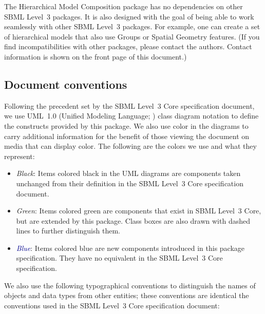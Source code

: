 The Hierarchical Model Composition package has no dependencies on other
SBML Level~3 packages.  It is also designed with the goal of being able
to work seamlessly with other SBML Level~3 packages.  For example, one
can create a set of hierarchical models that also use Groups or Spatial
Geometry features.  (If you find incompatibilities with other packages,
please contact the authors.  Contact information is shown on the front
page of this document.)


\subsection{Document conventions}
\label{conventions}

Following the precedent set by the SBML Level~3 Core specification
document, we use UML~1.0 (Unified Modeling Language;
\citealt{eriksson:1998,oestereich:1999}) class diagram notation to
define the constructs provided by this package.  We also use color in
the diagrams to carry additional information for the benefit of those
viewing the document on media that can display color.  The following are
the colors we use and what they represent:

\begin{itemize}

\item[\raisebox{2.75pt}{\colorbox{black}{\rule{0.8pt}{0.8pt}}}]
  \emph{Black}: Items colored black in the UML diagrams are components
  taken unchanged from their definition in the SBML Level~3 Core
  specification document.

\item[\raisebox{2.75pt}{\colorbox{mediumgreen}{\rule{0.8pt}{0.8pt}}}]
  \emph{\textcolor{mediumgreen}{Green}}: Items colored green are
  components that exist in SBML Level~3 Core, but are extended by this
  package.  Class boxes are also drawn with dashed lines to further
  distinguish them.

\item[\raisebox{2.75pt}{\colorbox{darkblue}{\rule{0.8pt}{0.8pt}}}]
  \emph{\textcolor{darkblue}{Blue}}: Items colored blue are new
  components introduced in this package specification.  They have no
  equivalent in the SBML Level~3 Core specification.

\end{itemize}

We also use the following typographical conventions to distinguish the
names of objects and data types from other entities; these conventions
are identical the conventions used in the SBML Level~3 Core specification
document:

